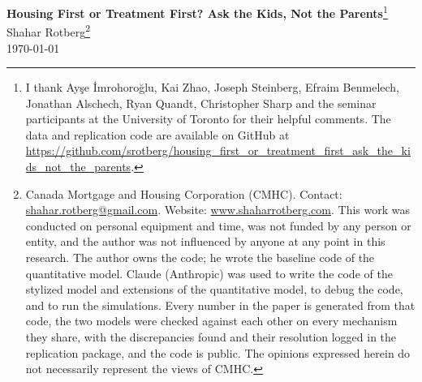 \documentclass[10pt]{article}
\begin{document}
\begin{center}
\renewcommand{\thefootnote}{\fnsymbol{footnote}}
{\Large\bfseries Housing First or Treatment First? Ask the Kids, Not the Parents}\footnote{I thank Ay\c{s}e \.{I}mrohoro\u{g}lu, Kai Zhao, Joseph Steinberg, Efraim Benmelech, Jonathan Alschech, Ryan Quandt, Christopher Sharp and the seminar participants at the University of Toronto for their helpful comments. The data and replication code are available on GitHub at \url{https://github.com/srotberg/housing_first_or_treatment_first_ask_the_kids_not_the_parents}.}\\[0.6em]
{\large Shahar Rotberg}\footnote{Canada Mortgage and Housing Corporation (CMHC). Contact: \url{shahar.rotberg@gmail.com}. Website: \url{www.shaharrotberg.com}. This work was conducted on personal equipment and time, was not funded by any person or entity, and the author was not influenced by anyone at any point in this research. The author owns the code; he wrote the baseline code of the quantitative model. Claude (Anthropic) was used to write the code of the stylized model and extensions of the quantitative model, to debug the code, and to run the simulations. Every number in the paper is generated from that code, the two models were checked against each other on every mechanism they share, with the discrepancies found and their resolution logged in the replication package, and the code is public. The opinions expressed herein do not necessarily represent the views of CMHC.}\\[0.35em]
\today
\end{center}
\renewcommand{\thefootnote}{\arabic{footnote}}
\setcounter{footnote}{0}
\end{document}
